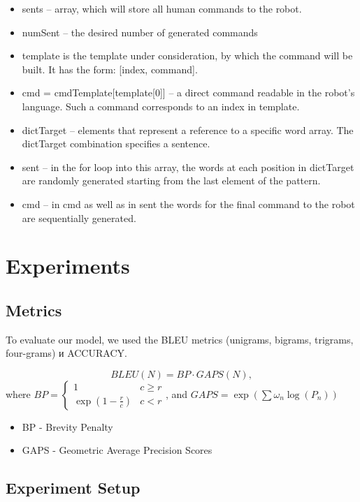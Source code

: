 \documentclass{article}
\begin{document}
\begin{itemize}
\item sents -- array, which will store all human commands to the robot.
\item numSent -- the desired number of generated commands
\item template is the template under consideration, by which the command will be built. It has the form: [index, command].
\item cmd = cmdTemplate[template[0]] -- a direct command readable in the robot's language. Such a command corresponds to an index in template.
\item dictTarget -- elements that represent a reference to a specific word array. The dictTarget combination specifies a sentence.
\item sent -- in the for loop into this array, the words at each position in dictTarget are randomly generated starting from the last element of the pattern.
\item cmd -- in cmd as well as in sent the words for the final command to the robot are sequentially generated.
\end{itemize}


\section{Experiments}

\subsection{Metrics}
To evaluate our model, we used the BLEU metrics (unigrams, bigrams, trigrams, four-grams) и ACCURACY.

$$BLEU(N) = BP \cdot GAPS(N),$$
where $BP = \begin{cases}
   1 &\text{$c \geq r $}\\
   \exp(1 - \frac{r}{c})  &\text{$c<r$}
 \end{cases}$, and $GAPS = \exp(\sum \omega_n \log(P_n))$

\begin{itemize}
\item BP - Brevity Penalty

\item GAPS - Geometric Average Precision Scores
\end{itemize}

\subsection{Experiment Setup}
\end{document}
